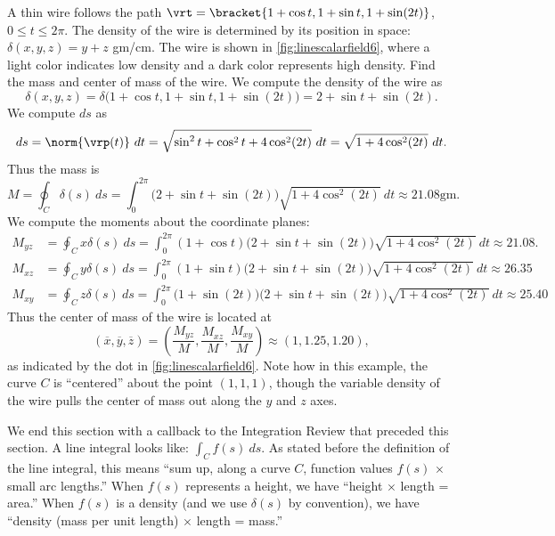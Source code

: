 \begin{example}\label{ex_linescalarfield6}
A
%
%
thin wire follows the path $\vrt =\bracket{1+\cos t,1+\sin t, 1+ \sin(2t)}$, $0\leq t\leq 2\pi$. The density of the wire is determined by its position in space: $\delta(x,y,z) = y+z$ gm/cm. The wire is shown in \autoref{fig:linescalarfield6}, where a light color indicates low density and a dark color represents high density. Find the mass  and center of mass of the wire.
\solution
We compute the density of the wire as 
\[
\delta(x,y,z) = \delta\bigl(1+\cos t,1+\sin t, 1+\sin(2t)\bigr) = 2+\sin t+\sin(2t).
\]
We compute $ds$ as
\[
ds = \norm{\vrp(t)}\ dt = \sqrt{\sin^2t+\cos^2t+4\cos^2(2t)}\ dt
= \sqrt{1+4\cos^2(2t)}\ dt.
\]
Thus the mass is
\[
M = \oint_C \delta(s)\ ds = \int_0^{2\pi} \bigl(2+\sin t+\sin(2t)\bigr)\sqrt{1+4\cos^2(2t)}\ dt
\approx 21.08\text{gm}.
\]
We compute the moments about the coordinate planes:\small
\begin{align*}
M_{yz} &= \oint_C x\delta(s)\ ds = \int_0^{2\pi}(1+\cos t)\bigl(2+\sin t+\sin(2t)\bigr)\sqrt{1+4\cos^2(2t)}\ dt \approx 21.08. \\
M_{xz} &= \oint_C y\delta(s)\ ds = \int_0^{2\pi}(1+\sin t)\bigl(2+\sin t+\sin(2t)\bigr)\sqrt{1+4\cos^2(2t)}\ dt \approx
26.35\\
M_{xy} &= \oint_C z\delta(s)\ ds = \int_0^{2\pi}\bigl(1+\sin(2 t)\bigr)\bigl(2+\sin t+\sin(2t)\bigr)\sqrt{1+4\cos^2(2t)}\ dt \approx 25.40
\end{align*}\normalsize
Thus the center of mass of the wire is located at 
\[
(\overline{x},\overline{y},\overline{z})
=\left(\frac{M_{yz}}M, \frac{M_{xz}}M,\frac{M_{xy}}M\right) \approx (1,1.25,1.20),
\]
as indicated by the dot in \autoref{fig:linescalarfield6}. Note how in this example, the curve $C$ is ``centered'' about the point $(1,1,1)$, though the variable density of the wire pulls the center of mass out along the $y$ and $z$ axes.
\end{example}

We end this section with a callback to the Integration Review that preceded this section. A line integral looks like: $\int_C f(s)\ ds$. As stated before the definition of the line integral, this means ``sum up, along a curve $C$, function values $f(s)$ $\times$ small arc lengths.'' When $f(s)$ represents a height, we have ``height $\times$ length = area.'' When $f(s)$ is a density (and we use $\delta(s)$ by convention), we have ``density (mass per unit length) $\times$ length = mass.''

